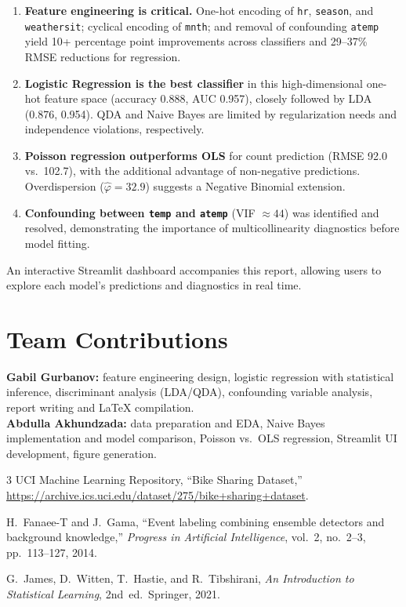 \documentclass[conference]{IEEEtran}
\begin{document}
\begin{enumerate}
    \item \textbf{Feature engineering is critical.} One-hot encoding of \texttt{hr}, \texttt{season}, and \texttt{weathersit}; cyclical encoding of \texttt{mnth}; and removal of confounding \texttt{atemp} yield 10+ percentage point improvements across classifiers and 29--37\% RMSE reductions for regression.

    \item \textbf{Logistic Regression is the best classifier} in this high-dimensional one-hot feature space (accuracy 0.888, AUC 0.957), closely followed by LDA (0.876, 0.954). QDA and Naive Bayes are limited by regularization needs and independence violations, respectively.

    \item \textbf{Poisson regression outperforms OLS} for count prediction (RMSE 92.0 vs.\ 102.7), with the additional advantage of non-negative predictions. Overdispersion ($\hat{\varphi} = 32.9$) suggests a Negative Binomial extension.

    \item \textbf{Confounding between \texttt{temp} and \texttt{atemp}} (VIF $\approx 44$) was identified and resolved, demonstrating the importance of multicollinearity diagnostics before model fitting.
\end{enumerate}

An interactive Streamlit dashboard accompanies this report, allowing users to explore each model's predictions and diagnostics in real time.

\section*{Team Contributions}
\textbf{Gabil Gurbanov:} feature engineering design, logistic regression with statistical inference, discriminant analysis (LDA/QDA), confounding variable analysis, report writing and LaTeX compilation.\\
\textbf{Abdulla Akhundzada:} data preparation and EDA, Naive Bayes implementation and model comparison, Poisson vs.\ OLS regression, Streamlit UI development, figure generation.

\begin{thebibliography}{3}
UCI Machine Learning Repository, ``Bike Sharing Dataset,'' \url{https://archive.ics.uci.edu/dataset/275/bike+sharing+dataset}.

H.~Fanaee-T and J.~Gama, ``Event labeling combining ensemble detectors and background knowledge,'' \textit{Progress in Artificial Intelligence}, vol.~2, no.~2--3, pp.~113--127, 2014.

G.~James, D.~Witten, T.~Hastie, and R.~Tibshirani, \textit{An Introduction to Statistical Learning}, 2nd~ed.\ Springer, 2021.
\end{thebibliography}
\end{document}
